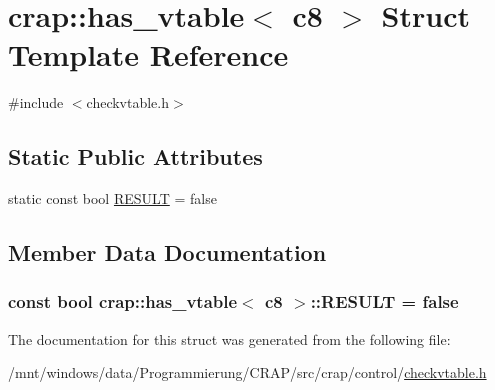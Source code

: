 \hypertarget{structcrap_1_1has__vtable_3_01c8_01_4}{\section{crap\-:\-:has\-\_\-vtable$<$ c8 $>$ Struct Template Reference}
\label{structcrap_1_1has__vtable_3_01c8_01_4}
}


{\ttfamily \#include $<$checkvtable.\-h$>$}

\subsection*{Static Public Attributes}
\begin{DoxyCompactItemize}
\item 
static const bool \hyperlink{structcrap_1_1has__vtable_3_01c8_01_4_acb52a40025dffeab43ce51ab6857b647}{R\-E\-S\-U\-L\-T} = false
\end{DoxyCompactItemize}


\subsection{Member Data Documentation}
\hypertarget{structcrap_1_1has__vtable_3_01c8_01_4_acb52a40025dffeab43ce51ab6857b647}{
\subsubsection[{R\-E\-S\-U\-L\-T}]{\setlength{\rightskip}{0pt plus 5cm}const bool {\bf crap\-::has\-\_\-vtable}$<$ {\bf c8} $>$\-::R\-E\-S\-U\-L\-T = false\hspace{0.3cm}{\ttfamily [static]}}}\label{structcrap_1_1has__vtable_3_01c8_01_4_acb52a40025dffeab43ce51ab6857b647}


The documentation for this struct was generated from the following file\-:\begin{DoxyCompactItemize}
\item 
/mnt/windows/data/\-Programmierung/\-C\-R\-A\-P/src/crap/control/\hyperlink{checkvtable_8h}{checkvtable.\-h}\end{DoxyCompactItemize}
